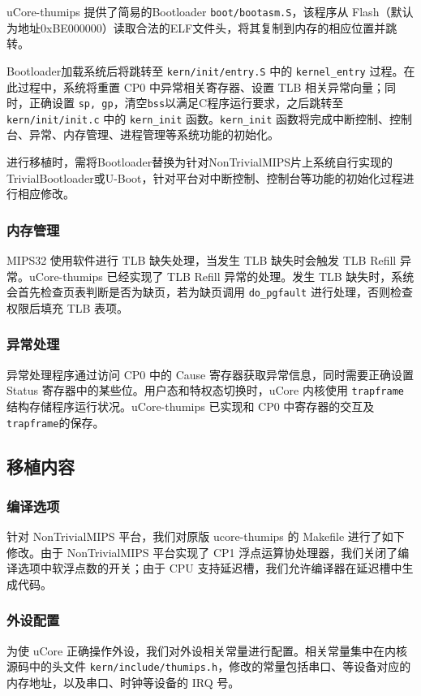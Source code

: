 uCore-thumips 提供了简易的Bootloader \texttt{boot/bootasm.S}，该程序从 Flash（默认为地址0xBE000000）读取合法的ELF文件头，将其复制到内存的相应位置并跳转。

Bootloader加载系统后将跳转至 \texttt{kern/init/entry.S} 中的 \texttt{kernel\_entry} 过程。在此过程中，系统将重置 CP0 中异常相关寄存器、设置 TLB 相关异常向量；同时，正确设置 \texttt{sp, gp}，清空\texttt{bss}以满足C程序运行要求，之后跳转至 \texttt{kern/init/init.c} 中的 \texttt{kern\_init} 函数。\texttt{kern\_init} 函数将完成中断控制、控制台、异常、内存管理、进程管理等系统功能的初始化。

进行移植时，需将Bootloader替换为针对NonTrivialMIPS片上系统自行实现的TrivialBootloader或U-Boot，针对平台对中断控制、控制台等功能的初始化过程进行相应修改。

\subsubsection{内存管理}

MIPS32 使用软件进行 TLB 缺失处理，当发生 TLB 缺失时会触发 TLB Refill 异常。uCore-thumips 已经实现了 TLB Refill 异常的处理。发生 TLB 缺失时，系统会首先检查页表判断是否为缺页，若为缺页调用 \texttt{do\_pgfault} 进行处理，否则检查权限后填充 TLB 表项。

\subsubsection{异常处理}
异常处理程序通过访问 CP0 中的 Cause 寄存器获取异常信息，同时需要正确设置 Status 寄存器中的某些位。用户态和特权态切换时，uCore 内核使用 \texttt{trapframe} 结构存储程序运行状况。uCore-thumips 已实现和 CP0 中寄存器的交互及\texttt{trapframe}的保存。

\subsection{移植内容}

\subsubsection{编译选项}
针对 NonTrivialMIPS 平台，我们对原版 ucore-thumips 的 Makefile 进行了如下修改。由于 NonTrivialMIPS 平台实现了 CP1 浮点运算协处理器，我们关闭了编译选项中软浮点数的开关；由于 CPU 支持延迟槽，我们允许编译器在延迟槽中生成代码。

\subsubsection{外设配置}
为使 uCore 正确操作外设，我们对外设相关常量进行配置。相关常量集中在内核源码中的头文件 \texttt{kern/include/thumips.h}，修改的常量包括串口、等设备对应的内存地址，以及串口、时钟等设备的 IRQ 号。

